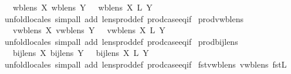 \begin{isabellebody}
\ \ {\isachardoublequoteopen}{\isasymlbrakk}\ wb{\isacharunderscore}lens\ X{\isacharsemicolon}\ wb{\isacharunderscore}lens\ Y\ {\isasymrbrakk}\ {\isasymLongrightarrow}\ wb{\isacharunderscore}lens\ {\isacharparenleft}X\ {\isasymtimes}\isactrlsub L\ Y{\isacharparenright}{\isachardoublequoteclose}\isanewline
%
\isadelimproof
\ \ %
\endisadelimproof
%
\isatagproof
{}\isamarkupfalse%
\ {\isacharparenleft}unfold{\isacharunderscore}locales{\isacharcomma}\ simp{\isacharunderscore}all\ add{\isacharcolon}\ lens{\isacharunderscore}prod{\isacharunderscore}def\ prod{\isachardot}case{\isacharunderscore}eq{\isacharunderscore}if{\isacharparenright}%
\endisatagproof
{\isafoldproof}%
%
\isadelimproof
\isanewline
%
\endisadelimproof
\isanewline
{}\isamarkupfalse%
\ prod{\isacharunderscore}vwb{\isacharunderscore}lens{\isacharcolon}\isanewline
\ \ {\isachardoublequoteopen}{\isasymlbrakk}\ vwb{\isacharunderscore}lens\ X{\isacharsemicolon}\ vwb{\isacharunderscore}lens\ Y\ {\isasymrbrakk}\ {\isasymLongrightarrow}\ vwb{\isacharunderscore}lens\ {\isacharparenleft}X\ {\isasymtimes}\isactrlsub L\ Y{\isacharparenright}{\isachardoublequoteclose}\isanewline
%
\isadelimproof
\ \ %
\endisadelimproof
%
\isatagproof
{}\isamarkupfalse%
\ {\isacharparenleft}unfold{\isacharunderscore}locales{\isacharcomma}\ simp{\isacharunderscore}all\ add{\isacharcolon}\ lens{\isacharunderscore}prod{\isacharunderscore}def\ prod{\isachardot}case{\isacharunderscore}eq{\isacharunderscore}if{\isacharparenright}%
\endisatagproof
{\isafoldproof}%
%
\isadelimproof
\isanewline
%
\endisadelimproof
\isanewline
{}\isamarkupfalse%
\ prod{\isacharunderscore}bij{\isacharunderscore}lens{\isacharcolon}\isanewline
\ \ {\isachardoublequoteopen}{\isasymlbrakk}\ bij{\isacharunderscore}lens\ X{\isacharsemicolon}\ bij{\isacharunderscore}lens\ Y\ {\isasymrbrakk}\ {\isasymLongrightarrow}\ bij{\isacharunderscore}lens\ {\isacharparenleft}X\ {\isasymtimes}\isactrlsub L\ Y{\isacharparenright}{\isachardoublequoteclose}\isanewline
%
\isadelimproof
\ \ %
\endisadelimproof
%
\isatagproof
{}\isamarkupfalse%
\ {\isacharparenleft}unfold{\isacharunderscore}locales{\isacharcomma}\ simp{\isacharunderscore}all\ add{\isacharcolon}\ lens{\isacharunderscore}prod{\isacharunderscore}def\ prod{\isachardot}case{\isacharunderscore}eq{\isacharunderscore}if{\isacharparenright}%
\endisatagproof
{\isafoldproof}%
%
\isadelimproof
\isanewline
%
\endisadelimproof
\isanewline
{}\isamarkupfalse%
\ fst{\isacharunderscore}vwb{\isacharunderscore}lens{\isacharcolon}\ {\isachardoublequoteopen}vwb{\isacharunderscore}lens\ fst\isactrlsub L{\isachardoublequoteclose}\isanewline

\end{isabellebody}
